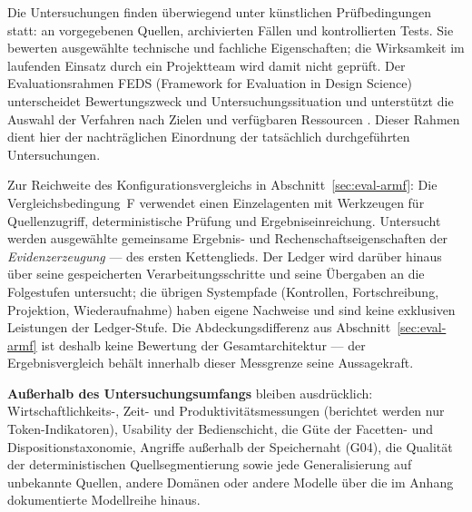 Die Untersuchungen finden überwiegend unter künstlichen Prüfbedingungen
statt: an vorgegebenen Quellen, archivierten Fällen und kontrollierten
Tests. Sie bewerten ausgewählte technische und fachliche Eigenschaften;
die Wirksamkeit im laufenden Einsatz durch ein Projektteam wird damit
nicht geprüft. Der Evaluationsrahmen FEDS (Framework for Evaluation
in Design Science) unterscheidet Bewertungszweck und
Untersuchungssituation und unterstützt die Auswahl der Verfahren nach
Zielen und verfügbaren Ressourcen \cite{venable2016feds}.
Dieser Rahmen dient hier der nachträglichen Einordnung der tatsächlich
durchgeführten Untersuchungen.

Zur Reichweite des Konfigurationsvergleichs in Abschnitt~\ref{sec:eval-armf}:
Die Vergleichsbedingung~F verwendet einen Einzelagenten mit
Werkzeugen für Quellenzugriff, deterministische Prüfung und
Ergebniseinreichung. Untersucht werden ausgewählte gemeinsame
Ergebnis- und Rechenschaftseigenschaften der
\emph{Evidenzerzeugung} --- des ersten Kettenglieds. Der Ledger
wird darüber hinaus über seine gespeicherten
Verarbeitungsschritte und seine Übergaben an die Folgestufen
untersucht; die übrigen Systempfade (Kontrollen, Fortschreibung,
Projektion, Wiederaufnahme) haben eigene Nachweise und sind keine
exklusiven Leistungen der Ledger-Stufe. Die Abdeckungsdifferenz
aus Abschnitt~\ref{sec:eval-armf} ist deshalb keine Bewertung der Gesamtarchitektur ---
der Ergebnisvergleich behält innerhalb dieser Messgrenze seine
Aussagekraft.

\textbf{Außerhalb des Untersuchungsumfangs} bleiben ausdrücklich:
Wirtschaftlichkeits-, Zeit- und Produktivitätsmessungen
(berichtet werden nur Token-Indikatoren), Usability der
Bedienschicht, die Güte der Facetten- und Dispositionstaxonomie,
Angriffe außerhalb der Speichernaht (G04), die Qualität der
deterministischen Quellsegmentierung sowie jede Generalisierung
auf unbekannte Quellen, andere Domänen oder andere Modelle über
die im Anhang dokumentierte Modellreihe hinaus.
